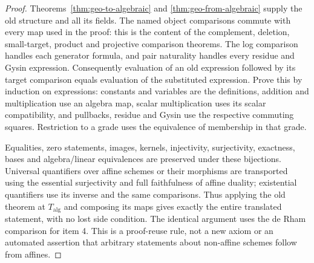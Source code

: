 \documentclass[11pt]{article}
\theoremstyle{definition}
\theoremstyle{remark}
\begin{document}
\begin{proof}
Theorems~\ref{thm:geo-to-algebraic} and \ref{thm:geo-from-algebraic} supply the old structure and all its fields. The named object comparisons commute with every map used in the proof: this is the content of the complement, deletion, small-target, product and projective comparison theorems. The log comparison handles each generator formula, and pair naturality handles every residue and Gysin expression. Consequently evaluation of an old expression followed by its target comparison equals evaluation of the substituted expression. Prove this by induction on expressions: constants and variables are the definitions, addition and multiplication use an algebra map, scalar multiplication uses its scalar compatibility, and pullbacks, residue and Gysin use the respective commuting squares. Restriction to a grade uses the equivalence of membership in that grade.

Equalities, zero statements, images, kernels, injectivity, surjectivity, exactness, bases and algebra/linear equivalences are preserved under these bijections. Universal quantifiers over affine schemes or their morphisms are transported using the essential surjectivity and full faithfulness of affine duality; existential quantifiers use its inverse and the same comparisons. Thus applying the old theorem at $T_{\mathrm{alg}}$ and composing its maps gives exactly the entire translated statement, with no lost side condition. The identical argument uses the de Rham comparison for item 4. This is a proof-reuse rule, not a new axiom or an automated assertion that arbitrary statements about non-affine schemes follow from affines.
\end{proof}
\end{document}
